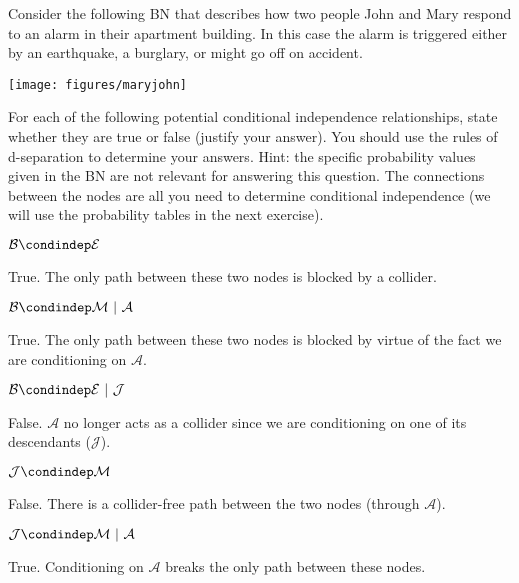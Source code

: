 \documentclass[assignment02_Solutions]{subfiles}
\begin{document}
\begin{exercise}[(15 minutes)]

Consider the following BN that describes how two people John and Mary respond to an alarm in their apartment building.  In this case the alarm is triggered either by an earthquake, a burglary, or might go off on accident.
\vspace{1em}
\begin{center}
\texttt{[image: figures/maryjohn]}
\end{center}

For each of the following potential conditional independence relationships, state whether they are true or false (justify your answer).  You should use the rules of d-separation to determine your answers.  Hint: the specific probability values given in the BN are not relevant for answering this question.  The connections between the nodes are all you need to determine conditional independence (we will use the probability tables in the next exercise).

\bes
\item $\mathcal{B} \condindep \mathcal{E}$
\begin{boxedsolution}
True. The only path between these two nodes is blocked by a collider.
\end{boxedsolution}
\item $\mathcal{B} \condindep \mathcal{M}~|~\mathcal{A}$
\begin{boxedsolution}
True. The only path between these two nodes is blocked by virtue of the fact we are conditioning on $\mathcal{A}$.
\end{boxedsolution}
\item $\mathcal{B} \condindep \mathcal{E}~|~\mathcal{J}$
\begin{boxedsolution}
False. $\mathcal{A}$ no longer acts as a collider since we are conditioning on one of its descendants ($\mathcal{J}$).
\end{boxedsolution}
\item $\mathcal{J} \condindep \mathcal{M}$
\begin{boxedsolution}
False. There is a collider-free path between the two nodes (through $\mathcal{A}$).
\end{boxedsolution}
\item $\mathcal{J} \condindep \mathcal{M}~|~\mathcal{A}$
\begin{boxedsolution}
True. Conditioning on $\mathcal{A}$ breaks the only path between these nodes.
\end{boxedsolution}
\ees
\end{exercise}
\end{document}
